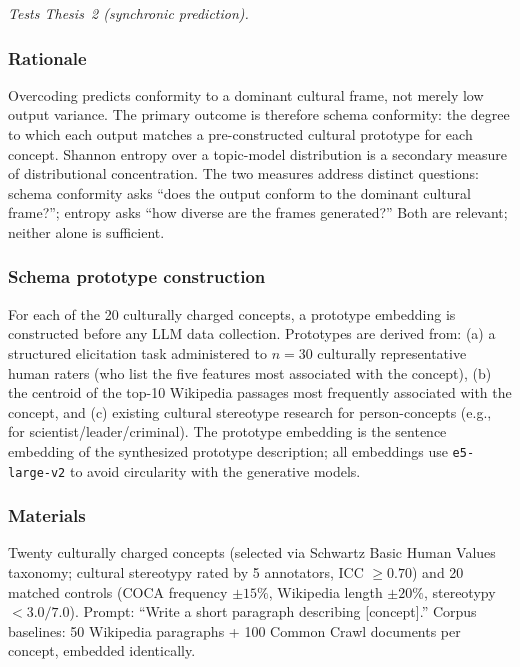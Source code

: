 \documentclass[12pt,a4paper]{article}
\begin{document}
\emph{Tests Thesis~2 (synchronic prediction).}

\subsubsection{Rationale}

Overcoding predicts conformity to a dominant cultural frame, not merely
low output variance. The primary outcome is therefore schema conformity:
the degree to which each output matches a pre-constructed cultural prototype
for each concept. Shannon entropy over a topic-model distribution is a
secondary measure of distributional concentration. The two measures address
distinct questions: schema conformity asks ``does the output conform to the
dominant cultural frame?''; entropy asks ``how diverse are the frames
generated?'' Both are relevant; neither alone is sufficient.

\subsubsection{Schema prototype construction}

For each of the 20 culturally charged concepts, a prototype embedding is
constructed before any LLM data collection. Prototypes are derived from:
(a) a structured elicitation task administered to $n = 30$ culturally
representative human raters (who list the five features most associated
with the concept), (b) the centroid of the top-10 Wikipedia passages most
frequently associated with the concept, and (c) existing cultural stereotype
research for person-concepts (e.g., \citealt{Fiske2002} for
scientist/leader/criminal). The prototype embedding is the sentence embedding
of the synthesized prototype description; all embeddings use
\texttt{e5-large-v2} to avoid circularity with the generative models.

\subsubsection{Materials}

Twenty culturally charged concepts (selected via Schwartz Basic Human Values
taxonomy; cultural stereotypy rated by 5 annotators, ICC $\geq 0.70$) and 20
matched controls (COCA frequency $\pm 15\%$, Wikipedia length $\pm 20\%$,
stereotypy $< 3.0/7.0$). Prompt: ``Write a short paragraph describing
[concept].'' Corpus baselines: 50 Wikipedia paragraphs + 100 Common Crawl
documents per concept, embedded identically.
\end{document}
